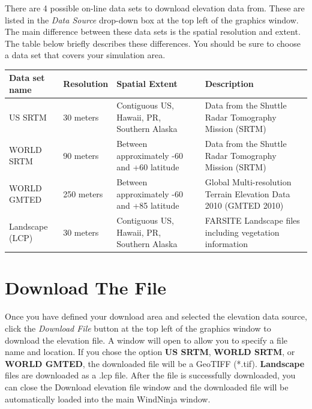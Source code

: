 \documentclass[12pt]{article}
\begin{document}
There are 4 possible on-line data sets to download elevation data from.  These are listed in the \textit{Data Source} drop-down box at the top left of the graphics window.  The main difference between these data sets is the spatial resolution and extent.  The table below briefly describes these differences.  You should be sure to choose a data set that covers your simulation area.

\begin{center}
    \begin{tabular}{| l | l | p{1.75in} | p{1.8in} |}
    \hline
    Data set name & Resolution & Spatial Extent & Description \\ \hline

    US SRTM & 30 meters  & Contiguous US, Hawaii, PR, Southern Alaska &
    Data from the Shuttle Radar Tomography Mission (SRTM) \\ \hline

    WORLD SRTM & 90 meters & Between approximately -60 and +60 latitude &
    Data from the Shuttle Radar Tomography Mission (SRTM) \\ \hline

    WORLD GMTED & 250 meters & Between approximately -60 and +85 latitude &
    Global Multi-resolution Terrain Elevation Data 2010 (GMTED 2010) \\ \hline

    Landscape (LCP) & 30 meters & Contiguous US, Hawaii, PR, Southern Alaska &
    FARSITE Landscape files including vegetation information \\ \hline
\end{tabular}
\end{center}


\section*{Download The File}
Once you have defined your download area and selected the elevation data source, click the \textit{Download File} button at the top left of the graphics window to download the elevation file.  A window will open to allow you to specify a file name and location.  %
If you chose the option \textbf{US SRTM}, \textbf{WORLD SRTM}, or \textbf{WORLD GMTED}, the downloaded file will be a GeoTIFF (*.tif). \textbf{Landscape} files are downloaded as a .lcp file.
After the file is successfully downloaded, you can close the Download elevation file window and the downloaded file will be automatically loaded into the main WindNinja window.
\end{document}
